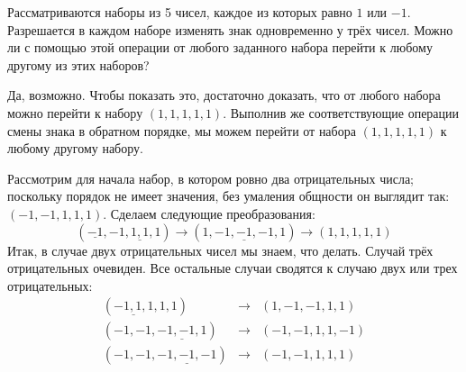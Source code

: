 
\begin{itemize}
\itB Рассматриваются наборы из 5 чисел, каждое из которых равно $1$ или $-1$. Разрешается в 
каждом наборе изменять знак одновременно у трёх чисел. Можно ли с помощью этой операции 
от любого заданного набора перейти к любому другому из этих наборов?

\itr Да, возможно. Чтобы показать это, достаточно доказать, что от любого набора можно 
перейти к набору $(1,1,1,1,1)$. Выполнив же соответствующие операции смены знака в 
обратном порядке, мы можем перейти от набора $(1,1,1,1,1)$ к любому другому набору.

Рассмотрим для начала набор, в котором ровно два 
отрицательных числа; поскольку порядок не имеет значения, без умаления общности он 
выглядит так: $(-1,-1,1,1,1)$. Сделаем следующие преобразования:
$$
(\underline{-1},-1,\underline{1,1},1)\to (1,\underline{-1,-1,-1},1) \to (1,1,1,1,1)
$$
Итак, в случае двух отрицательных чисел мы знаем, что делать. Случай трёх отрицательных 
очевиден. Все остальные случаи сводятся к случаю двух или трех отрицательных:
$$\begin{array}{rcl}
(\underline{-1,1,1},1,1) &\to & (1,-1,-1,1,1) \\
(-1,-1,\underline{-1,-1,1}) & \to & (-1,-1,1,1,-1) \\
(-1,-1,\underline{-1,-1,-1}) & \to & (-1,-1,1,1,1)
\end{array}$$

%
%
\end{itemize}



